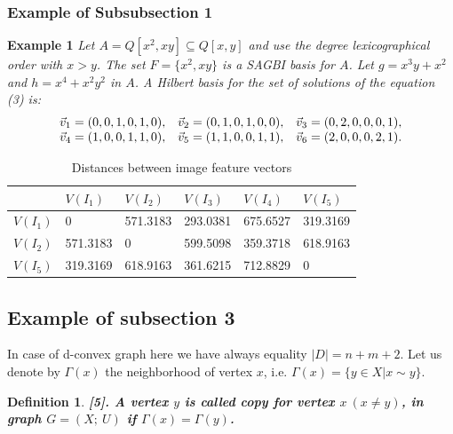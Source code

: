 \documentclass[11pt,a5paper,twoside]{article}
\newtheorem{definition}{Definition}
\begin{document}
\subsubsection{Example of Subsubsection 1}\label{subsubsect1}

\textbf{Example 1} \textit{Let $A=Q[x^{2}, xy] \subseteq  Q[x, y]$ and use the degree lexicographical order with $x>y$. The set $F=\{x^{2}, xy\}$ is a SAGBI basis for $A$. Let $g=x^{3}y+x^{2}$ and $h=x^{4}+x^{2}y^{2}$ in $A$. A Hilbert basis for the set of solutions of the equation (3) is:} 
\[
{\begin{array}{*{20}c}
	{\vec {v}_1 =(0,0,1,0,1,0),} \hfill & {\vec {v}_2 =(0,1,0,1,0,0),} \hfill & 
	{\vec {v}_3 =(0,2,0,0,0,1),} \hfill \\
	{\vec {v}_4 =(1,0,0,1,1,0),} \hfill & {\vec {v}_5 =(1,1,0,0,1,1),} \hfill & 
	{\vec {v}_6 =(2,0,0,0,2,1).} \hfill \\
	\end{array} }
\]



\begin{table}[htbp]
	\caption{Distances between image feature vectors} \vspace{3mm}
	\begin{tabular}
		{|p{34pt}|p{44pt}|p{44pt}|p{44pt}|p{44pt}|p{44pt}|} \hline &
		$V(I_{1} )$& $V(I_{2} )$& $V(I_{3} )$& $V(I_{4} )$&
		$V(I_{5} )$ \\
		\hline $V(I_{1} )$& 0& 571.3183& 293.0381& 675.6527&
		319.3169 \\
		\hline $V(I_{2} )$& 571.3183& 0& 599.5098& 359.3718&
		618.9163 \\
		\hline $V(I_{5} )$& 319.3169& 618.9163& 361.6215& 712.8829&
		0 \\
		\hline
	\end{tabular}
	\label{tab1}
\end{table}

\subsection{Example of subsection 3}
In case of d-convex graph here we have always equality
$|D|=n+m+2$. Let us denote by $\Gamma(x)$ the neighborhood of
vertex $x$, i.e. $\Gamma(x) = \{ y\in X | x\sim y \} $.

\begin{definition}
\bf{[5].} \it{A vertex $y$ is called copy for vertex $x\: (x \neq
y)$, in graph $G=(X;\: U)$ if $\Gamma(x) = \Gamma(y)$.}
\end{definition}
\end{document}
